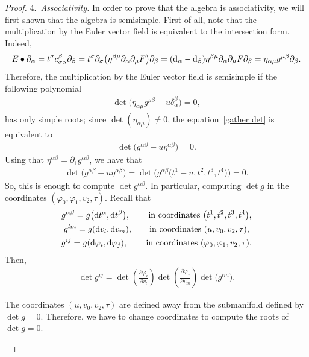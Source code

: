 \documentclass[pdftex]{sigma}%
\numberwithin{equation}{section}
\begin{document}
\begin{proof}
4.\ \textit{Associativity.}
In order to prove that the algebra is associativity, we will first shown that the algebra is semisimple. First of all, note that the multiplication by the Euler vector field is equivalent to the intersection form. Indeed,
\begin{gather}
\label{relation multiplication Euler and intersection form}
E\bullet\partial_{\alpha}=t^{\sigma}c_{\sigma\alpha}^{\beta}\partial_{\beta} =t^{\sigma}\partial_{\sigma}\big(\eta^{\beta\mu}\partial_{\alpha}\partial_{\mu}F \big) \partial_{\beta}
=({\rm d}_{\alpha}-{\rm d}_{\beta})\eta^{\beta\mu}\partial_{\alpha}\partial_{\mu}F \partial_{\beta}=\eta_{\alpha\mu}g^{\mu\beta} \partial_{\beta}.
\end{gather}
Therefore, the multiplication by the Euler vector field is semisimple if the following polynomial
\begin{gather}\label{gather det}
\det\big(\eta_{\alpha\mu}g^{\mu\beta}-u\delta_{\alpha}^{\beta}\big)=0,
\end{gather}
has only simple roots; since $\det(\eta_{\alpha\mu})\neq 0$, the equation~\eqref{gather det} is equivalent to
\begin{gather*}
\det\big(g^{\alpha\beta}-u\eta^{\alpha\beta}\big)=0.
\end{gather*}
Using that $\eta^{\alpha\beta}=\partial_1g^{\alpha\beta}$, we have that
\begin{gather*}
\det\big(g^{\alpha\beta}-u\eta^{\alpha\beta}\big)=\det \big(g^{\alpha\beta}\big(t^1-u,t^2,t^3,t^4\big)\big)=0.
\end{gather*}
So, this is enough to compute $\det g^{\alpha\beta}$. In particular, computing $\det g$ in the coordinates $(\varphi_0,\varphi_1,v_2, \tau)$. Recall that
\begin{gather*}
g^{\alpha\beta}=g\big({\rm d}t^{\alpha},{\rm d}t^{\beta}\big),\qquad\, \text{in coordinates } \big(t^1,t^2,t^3,t^4\big),
\\
g^{lm}=g({{\rm d}v_l,{\rm d}v_m}), \qquad \text{in coordinates } (u,v_0,v_2,\tau),
\\
g^{ij}=g({{\rm d}\varphi_i,{\rm d}\varphi_j}), \qquad\, \text{in coordinates } (\varphi_0,\varphi_1,v_2,\tau).
\end{gather*}
Then,
\begin{gather*}
\det g^{ij}= \det\left(\frac{\partial\varphi_i}{\partial v_l} \right) \det\left(\frac{\partial\varphi_j}{\partial v_m} \right)\det \big(g^{lm}\big).
\end{gather*}

\begin{Remark}The coordinates $(u,v_0,v_2,\tau)$ are defined away from the submanifold defined by $\det g=0$. Therefore, we have to change coordinates to compute the roots of $\det g=0$.
\end{Remark}


\end{proof}
\end{document}
